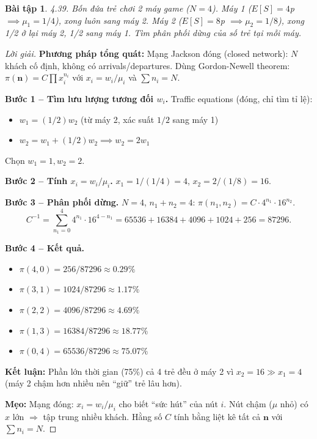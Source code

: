 \documentclass[8pt,a4paper]{article}
\newtheorem{exercise}{Bài tập}
\newenvironment{solution}{\begin{proof}[Lời giải]}{\end{proof}}
\begin{document}
\begin{exercise}
4.39. Bốn đứa trẻ chơi 2 máy game ($N=4$). Máy 1 ($E[S]=4$p $\implies \mu_1=1/4$), xong luôn sang máy 2. Máy 2 ($E[S]=8$p $\implies \mu_2=1/8$), xong 1/2 ở lại máy 2, 1/2 sang máy 1. Tìm phân phối dừng của số trẻ tại mỗi máy.
\end{exercise}
\begin{solution}
\textbf{Phương pháp tổng quát:} Mạng Jackson đóng (closed network): $N$ khách cố định, không có arrivals/departures. Dùng Gordon-Newell theorem: $\pi(\mathbf{n}) = C \prod x_i^{n_i}$ với $x_i = w_i/\mu_i$ và $\sum n_i = N$.

\textbf{Bước 1 -- Tìm lưu lượng tương đối $w_i$.} Traffic equations (đóng, chỉ tìm tỉ lệ):
\begin{itemize}[nosep]
\item $w_1 = (1/2)w_2$ \quad (từ máy 2, xác suất $1/2$ sang máy 1)
\item $w_2 = w_1 + (1/2)w_2 \implies w_2 = 2w_1$
\end{itemize}
Chọn $w_1 = 1, w_2 = 2$.

\textbf{Bước 2 -- Tính $x_i = w_i/\mu_i$.}
$x_1 = 1/(1/4) = 4$, \quad $x_2 = 2/(1/8) = 16$.

\textbf{Bước 3 -- Phân phối dừng.} $N = 4$, $n_1 + n_2 = 4$:
$\pi(n_1, n_2) = C \cdot 4^{n_1} \cdot 16^{n_2}$.
\[
C^{-1} = \sum_{n_1=0}^4 4^{n_1} \cdot 16^{4-n_1} = 65536 + 16384 + 4096 + 1024 + 256 = 87296.
\]

\textbf{Bước 4 -- Kết quả.}
\begin{itemize}[nosep]
\item $\pi(4,0) = 256/87296 \approx 0.29\%$
\item $\pi(3,1) = 1024/87296 \approx 1.17\%$
\item $\pi(2,2) = 4096/87296 \approx 4.69\%$
\item $\pi(1,3) = 16384/87296 \approx 18.77\%$
\item $\pi(0,4) = 65536/87296 \approx \boxed{75.07\%}$
\end{itemize}

\textbf{Kết luận:} Phần lớn thời gian (75\%) cả 4 trẻ đều ở máy 2 vì $x_2 = 16 \gg x_1 = 4$ (máy 2 chậm hơn nhiều nên ``giữ'' trẻ lâu hơn).

\textbf{Mẹo:} Mạng đóng: $x_i = w_i/\mu_i$ cho biết ``sức hút'' của nút $i$. Nút chậm ($\mu$ nhỏ) có $x$ lớn $\Rightarrow$ tập trung nhiều khách. Hằng số $C$ tính bằng liệt kê tất cả $\mathbf{n}$ với $\sum n_i = N$.
\end{solution}
\end{document}
